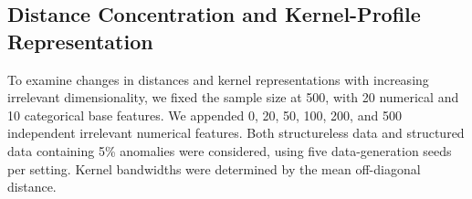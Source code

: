 \documentclass[ASNA,twocolumn]{USG} %
\begin{document}
\begin{table}[!ht]
	\centering
	\caption{Ablation study results of KSRA in terms of average AUC across the 10 benchmark datasets.}\label{tab:ablation_illustrative_subset}
\end{table}

\subsection{Distance Concentration and Kernel-Profile Representation}

To examine changes in distances and kernel representations with increasing irrelevant dimensionality, we fixed the sample size at 500, with 20 numerical and 10 categorical base features. We appended 0, 20, 50, 100, 200, and 500 independent irrelevant numerical features. Both structureless data and structured data containing 5\% anomalies were considered, using five data-generation seeds per setting. Kernel bandwidths were determined by the mean off-diagonal distance.
\end{document}
